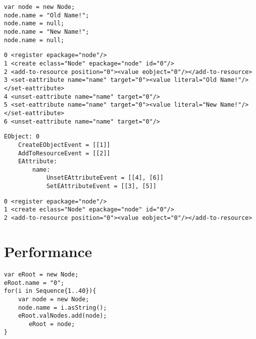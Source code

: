 \begin{lstlisting}[style=eol,caption={The EOL code for Nullyfying/Unsetting  Attribute.},label=lst:unset_attribute_eol]
var node = new Node;
node.name = "Old Name!";
node.name = null;
node.name = "New Name!";
node.name = null;
\end{lstlisting}

\begin{lstlisting}[style=cbp-xml,caption={The generated change-based representation of Lst. \ref{lst:unset_attribute_eol}. },label=lst:unset_attribute_cbp]
0 <register epackage="node"/>
1 <create eclass="Node" epackage="node" id="0"/>
2 <add-to-resource position="0"><value eobject="0"/></add-to-resource>
3 <set-eattribute name="name" target="0"><value literal="Old Name!"/></set-eattribute>
4 <unset-eattribute name="name" target="0"/>
5 <set-eattribute name="name" target="0"><value literal="New Name!"/></set-eattribute>
6 <unset-eattribute name="name" target="0"/>
\end{lstlisting}

\begin{lstlisting}[style=cbp-xml,caption={The event-line relationships recorded by an EObjectHistory of Lst. \ref{lst:unset_attribute_eol}. },label=lst:unset_attribute_eobject_history]
EObject: 0
    CreateEObjectEvent = [[1]]
    AddToResourceEvent = [[2]]
    EAttribute:
        name:
            UnsetEAttributeEvent = [[4], [6]]
            SetEAttributeEvent = [[3], [5]]
\end{lstlisting}

\begin{lstlisting}[style=cbp-xml,caption={The optimised change-based Representation of Lst. \ref{lst:unset_attribute_eol}. },label=lst:unset_attribute_optimised_cbp]
0 <register epackage="node"/>
1 <create eclass="Node" epackage="node" id="0"/>
2 <add-to-resource position="0"><value eobject="0"/></add-to-resource>
\end{lstlisting}

\section{Performance}

\begin{lstlisting}[style=eol,caption={The EOL code for creating deep tree of nodes.},label=lst:deep_tree_eol]
var eRoot = new Node;
eRoot.name = "0";
for(i in Sequence{1..40}){
    var node = new Node;
    node.name = i.asString();
    eRoot.valNodes.add(node);
	   eRoot = node;
}
\end{lstlisting}

